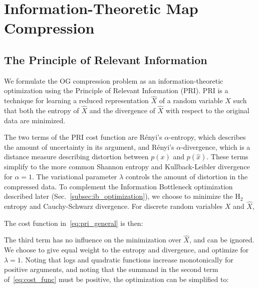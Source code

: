 \chapter{Information-Theoretic Map Compression}
\label{chapter3}

\section{The Principle of Relevant Information}

We formulate the OG compression problem as an information-theoretic optimization using the Principle of Relevant Information (PRI). PRI is a technique for learning a reduced representation $\hat{X}$ of a random variable $X$ such that both the entropy of $\hat{X}$ and the divergence of $\hat{X}$ with respect to the original data are minimized.
%

The two terms of the PRI cost function are R\'{e}nyi's $\alpha$-entropy, which describes the amount of uncertainty in its argument, and R\'{e}nyi's $\alpha$-divergence, which is a distance measure describing distortion between $p(x)$ and $p(\hat{x})$. These terms simplify to the more common Shannon entropy and Kullback-Leibler divergence for $\alpha = 1$. The variational parameter $\lambda$ controls the amount of distortion in the compressed data. To complement the Information Bottleneck optimization described later (Sec.~\ref{subsec:ib_optimization}), we choose to minimize the $\text{H}_{2}$ entropy and Cauchy-Schwarz divergence. For discrete random variables $X$ and $\hat{X}$,
%

The cost function in~\eqref{eq:pri_general} is then:
%

The third term has no influence on the minimization over $\hat{X}$, and can be ignored. We choose to give equal weight to the entropy and divergence, and optimize for $\lambda=1$. Noting that logs and quadratic functions increase monotonically for positive arguments, and noting that the summand in the second term of~\eqref{eq:cost_func} must be positive, the optimization can be simplified to:
%


